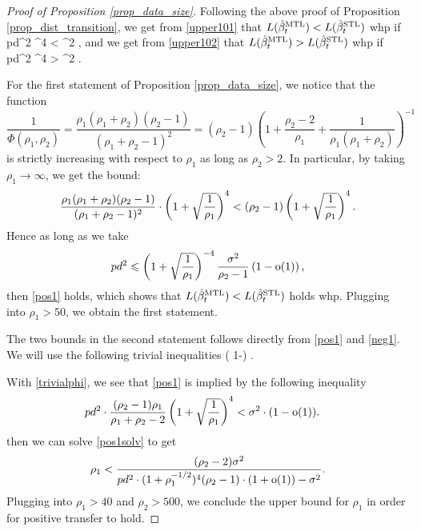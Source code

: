 \begin{proof}[Proof of Proposition \ref{prop_data_size}]
Following the above proof of Proposition \ref{prop_dist_transition}, we get from \eqref{upper101} that $L(\hat{\beta}_t^{\text{MTL}})< L(\hat{\beta}_t^{\text{STL}})$ whp if
\be\label{pos1}
pd^2  \cdot {}^4 <  \sigma^2  ,\ee
and we get from \eqref{upper102} that $L(\hat{\beta}_t^{\text{MTL}})>L(\hat{\beta}_t^{\text{STL}})$ whp if
\be\label{neg1}pd^2  \cdot {}^4 >  \sigma^2  .\ee


For the first statement of Proposition \ref{prop_data_size}, we notice that the function
$$\frac1{ \Phi(\rho_1, \rho_2)}=\frac{\rho_1 (\rho_1 + \rho_2) (\rho_2 - 1)}{(\rho_1 + \rho_2 - 1)^2}=(\rho_2-1) \left(1 +\frac{\rho_2-2}{\rho_1}+\frac{1}{\rho_1(\rho_1+\rho_2)}\right)^{-1} $$
is strictly increasing with respect to $\rho_1$ as long as $\rho_2> 2$. In particular, by taking $\rho_1\to \infty$, we get the bound:
$$\frac{\rho_1(\rho_1+\rho_2)(\rho_2-1)}{(\rho_1+\rho_2-1)^2} \cdot \left({1 + \sqrt{\frac{1}{\rho_1}}}\right)^4 <  (\rho_2-1) \left({1 + \sqrt{\frac{1}{\rho_1}}}\right)^4.$$
Hence as long as we take 
 $$pd^2  \leqslant \left({1 + \sqrt{\frac{1}{\rho_1}}}\right)^{-4}\frac{\sigma^2}{\rho_2-1}\left(1 -\operatorname{o}(1)\right),$$ 
 then \eqref{pos1} holds, which shows that  $L(\hat{\beta}_t^{\text{MTL}}) < L(\hat{\beta}_t^{\text{STL}})$ holds whp. Plugging into $\rho_1>50$, we obtain the first statement. 

The two bounds in the second statement follows directly from \eqref{pos1} and \eqref{neg1}. We will use the following trivial inequalities 
\be\label{trivialphi}
\cdot \left( 1-\right) \le {} \le  {}.
\ee

%

 With \eqref{trivialphi}, we see that \eqref{pos1} is implied by the following inequality
\begin{align}\label{pos1solv}
 & pd^2 \cdot \frac{(\rho_2-1) \rho_1 }{\rho_1+\rho_2-2} \left({1 + \sqrt{\frac{1}{\rho_1}}}\right)^4 <\sigma^2\cdot (1-\operatorname{o}(1)) .
 \end{align}
 then we can solve \eqref{pos1solv} to get
 $$\rho_1 < \frac{(\rho_2-2) \sigma^2}{pd^2 \cdot (1+\rho_1^{-1/2})^4 (\rho_2 - 1)\cdot (1+\operatorname{o}(1))  - \sigma^2}  .$$
 Plugging into $\rho_1>40$ and $\rho_2>500$, we conclude the upper bound for $\rho_1$ in order for positive transfer to hold.


\end{proof}
